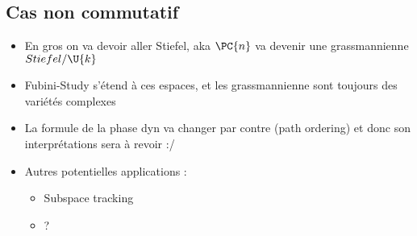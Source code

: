 \subsection{\todo Cas non commutatif}\label{subsec:non-commu}

\begin{itemize}
	
	\item En gros on va devoir aller Stiefel, aka $\PC{n}$ va devenir une grassmannienne $Stiefel/\U{k}$
	
	\item Fubini-Study s'étend à ces espaces, et les grassmannienne sont toujours des variétés complexes
	
	\item La formule de la phase dyn va changer par contre (path ordering) et donc son interprétations sera à revoir :/
	
	\item Autres potentielles applications :
	\begin{itemize}
		
		\item Subspace tracking
		
		\item ?
	\end{itemize}
	
\end{itemize}